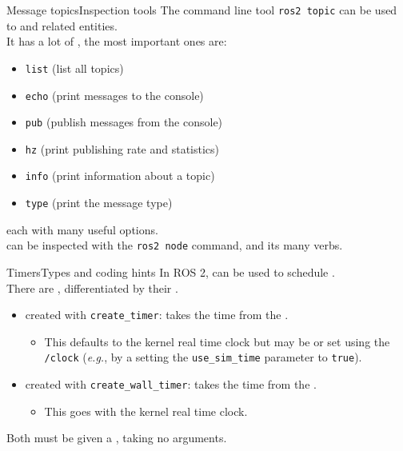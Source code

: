 \begin{frame}{Message topics}{Inspection tools}
  \justifying
  The command line tool \texttt{ros2 topic} can be used to  and related entities.\\
  It has a lot of , the most important ones are:
  \begin{itemize}
    \item \texttt{list} (list all topics)
    \item \texttt{echo} (print messages to the console)
    \item \texttt{pub} (publish messages from the console)
    \item \texttt{hz} (print publishing rate and statistics)
    \item \texttt{info} (print information about a topic)
    \item \texttt{type} (print the message type)
  \end{itemize}
  each with many useful options.\\
   can be inspected with the \texttt{ros2 node} command, and its many verbs.
\end{frame}

\begin{frame}{Timers}{Types and coding hints}
  \justifying
  In ROS 2,  can be used to schedule .\\
  \bigskip
  There are , differentiated by their .
  \begin{itemize}
    \item {} created with \texttt{create\_timer}: takes the time from the .
      \begin{itemize}
        \item This defaults to the kernel real time clock but may be  or set using the \texttt{/clock}  (\emph{e.g.}, by a  setting the \texttt{use\_sim\_time} parameter to \texttt{true}).
      \end{itemize}
    \item {} created with \texttt{create\_wall\_timer}: takes the time from the .
      \begin{itemize}
        \item This goes with the kernel real time clock.
      \end{itemize}
  \end{itemize}
  \bigskip
  Both must be given a , taking no arguments.
\end{frame}
